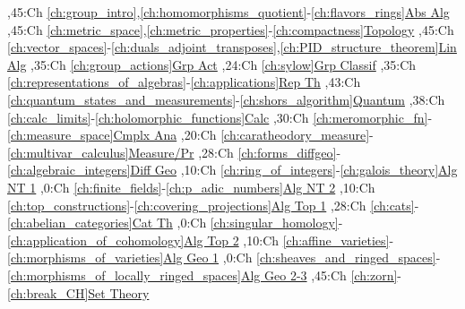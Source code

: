 
\bgroup
\renewcommand{\href}[1]{} %
\hypersetup{linkcolor=black} %
\renewcommand{\solidwidth}{0.7pt}
\renewcommand{\boldwidth}{1.5pt}

\setcounter{diagheight}{50}
\begin{chart}
,45:{Ch \ref*{ch:group_intro},\ref*{ch:homomorphisms_quotient}-\ref*{ch:flavors_rings}}{\hyperref[part:absalg]{Abs Alg}}{}
,45:{Ch \ref*{ch:metric_space},\ref*{ch:metric_properties}-\ref*{ch:compactness}}{\hyperref[part:basictop]{Topology}}{}
,45:{Ch \ref*{ch:vector_spaces}-\ref*{ch:duals_adjoint_transposes},\ref*{ch:PID_structure_theorem}}{\hyperref[part:linalg]{Lin Alg}}{}
,35:{Ch \ref*{ch:group_actions}}{\hyperref[part:groups]{Grp Act}}{}
,24:{Ch \ref*{ch:sylow}}{\hyperref[ch:sylow]{Grp Classif}}{}
,35:{Ch \ref*{ch:representations_of_algebras}-\ref*{ch:applications}}{\hyperref[part:repth]{Rep Th}}{}
,43:{Ch \ref*{ch:quantum_states_and_measurements}-\ref*{ch:shors_algorithm}}{\hyperref[part:quantum]{Quantum}}{}
,38:{Ch \ref*{ch:calc_limits}-\ref*{ch:holomorphic_functions}}{\hyperref[part:calc]{Calc}}{}
,30:{Ch \ref*{ch:meromorphic_fn}-\ref*{ch:measure_space}}{\hyperref[part:cmplxana]{Cmplx Ana}}{}
,20:{Ch \ref*{ch:caratheodory_measure}-\ref*{ch:multivar_calculus}}{\hyperref[part:measure]{Measure/Pr}}{}
,28:{Ch \ref*{ch:forms_diffgeo}-\ref*{ch:algebraic_integers}}{\hyperref[part:diffgeo]{Diff Geo}}{}
,10:{Ch \ref*{ch:ring_of_integers}-\ref*{ch:galois_theory}}{\hyperref[part:algnt1]{Alg NT 1}}{}
,0:{Ch \ref*{ch:finite_fields}-\ref*{ch:p_adic_numbers}}{\hyperref[part:algnt2]{Alg NT 2}}{}
,10:{Ch \ref*{ch:top_constructions}-\ref*{ch:covering_projections}}{\hyperref[part:algtop1]{Alg Top 1}}{}
,28:{Ch \ref*{ch:cats}-\ref*{ch:abelian_categories}}{\hyperref[part:cats]{Cat Th}}{}
,0:{Ch \ref*{ch:singular_homology}-\ref*{ch:application_of_cohomology}}{\hyperref[part:algtop2]{Alg Top 2}}{}
,10:{Ch \ref*{ch:affine_varieties}-\ref*{ch:morphisms_of_varieties}}{\hyperref[part:ag1]{Alg Geo 1}}{}
,0:{Ch \ref*{ch:sheaves_and_ringed_spaces}-\ref*{ch:morphisms_of_locally_ringed_spaces}}{\hyperref[part:ag2]{Alg Geo 2-3}}{}
,45:{Ch \ref*{ch:zorn}-\ref*{ch:break_CH}}{\hyperref[part:st1]{Set Theory}}{}


\end{chart}
